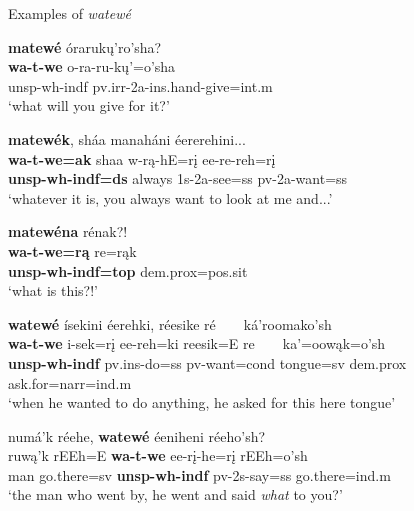 \begin{exe}

\item\label{ExamplesOfWatewe} Examples of \textit{watewé}

\begin{xlist}

\item\label{ExamplesOfWatewe1} \glll \textbf{matewé} órarukų'ro'sha?\\
    \textbf{wa-t-we} o-ra-ru-kų'=o'sha\\
    unsp-wh-indf pv.irr-2a-ins.hand-\textnormal{give}=int.m\\
    \glt `what will you give for it?' \citep[29]{hollow1973a}
    
\item\label{ExamplesOfWatewe2} \glll \textbf{matewék}, sháa manaháni éererehini...\\
    \textbf{wa-t-we=ak} shaa w-rą-hE=rį ee-re-reh=rį\\
    \textbf{unsp-wh-indf=ds} \textnormal{always} 1s-2a-\textnormal{see}=ss pv-2a-\textnormal{want}=ss\\
    \glt `whatever it is, you always want to look at me and...' \citep[95]{hollow1973a}
    
\item\label{ExamplesOfWatewe3} \glll \textbf{matewéna} rénak?!\\
    \textbf{wa-t-we=rą} re=rąk\\
    \textbf{unsp-wh-indf=top} dem.prox=pos.sit\\
    \glt `what is this?!' \citep[107]{hollow1973a}
    
\item\label{ExamplesOfWatewe4} \glll \textbf{watewé} ísekini éerehki, réesike ré ~ ~ ká'roomako'sh\\
    \textbf{wa-t-we} i-sek=rį ee-reh=ki reesik=E re ~ ~  ka'=oowąk=o'sh\\
    \textbf{unsp-wh-indf} pv.ins-\textnormal{do}=ss pv-\textnormal{want}=cond \textnormal{tongue}=sv dem.prox ~ ~ \textnormal{ask.for}=narr=ind.m\\
    \glt `when he wanted to do anything, he asked for this here tongue' \citep[187]{hollow1973a}

\newpage
    
\item\label{ExamplesOfWatewe5} \glll numá'k réehe, \textbf{watewé} éeniheni réeho'sh?\\
    ruwą'k rEEh=E \textbf{wa-t-we} ee-rį-he=rį rEEh=o'sh\\
    \textnormal{man} \textnormal{go.there}=sv \textbf{unsp-wh-indf} pv-2s-\textnormal{say}=ss \textnormal{go.there}=ind.m\\
    \glt `the man who went by, he went and said \textit{what} to you?' \citep[187]{hollow1973a}
    

\end{xlist}
\end{exe}
